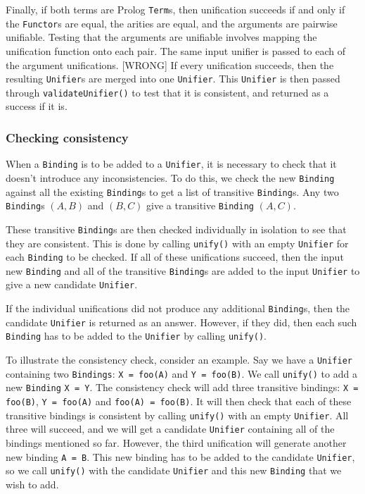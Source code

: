 \documentclass[12pt]{article}
\begin{document}
Finally, if both terms are Prolog \verb|Term|s, then unification succeeds if and only if the \verb|Functor|s are equal, the arities are equal, and the arguments are pairwise unifiable. 
Testing that the arguments are unifiable involves mapping the unification function onto each pair. 
The same input unifier is passed to each of the argument unifications. [WRONG]
If every unification succeeds, then the resulting \verb|Unifier|s are merged into one \verb|Unifier|. 
This \verb|Unifier| is then passed through \verb|validateUnifier()| to test that it is consistent, and returned as a success if it is.

\subsubsection{Checking consistency}


When a \verb|Binding| is to be added to a \verb|Unifier|, it is necessary to check that it doesn't introduce any inconsistencies. 
To do this, we check the new \verb|Binding| against all the existing \verb|Binding|s to get a list of transitive \verb|Binding|s. 
Any two \verb|Binding|s $(A,B)$ and $(B,C)$ give a transitive \verb|Binding| $(A,C)$.

These transitive \verb|Binding|s are then checked individually in isolation to see that they are consistent. 
This is done by calling \verb|unify()| with an empty \verb|Unifier| for each \verb|Binding| to be checked. 
If all of these unifications succeed, then the input new \verb|Binding| and all of the transitive \verb|Binding|s are added to the input \verb|Unifier| to give a new candidate \verb|Unifier|.

If the individual unifications did not produce any additional \verb|Binding|s, then the candidate \verb|Unifier| is returned as an answer. 
However, if they did, then each such \verb|Binding| has to be added to the \verb|Unifier| by calling \verb|unify()|.

To illustrate the consistency check, consider an example. 
Say we have a \verb|Unifier| containing two \verb|Bindings|: \verb|X = foo(A)| and \verb|Y = foo(B)|. 
We call \verb|unify()| to add a new \verb|Binding| \verb|X = Y|. 
The consistency check will add three transitive bindings: \verb|X = foo(B)|, \verb|Y = foo(A)| and \verb|foo(A) = foo(B)|. 
It will then check that each of these transitive bindings is consistent by calling \verb|unify()| with an empty \verb|Unifier|. 
All three will succeed, and we will get a candidate \verb|Unifier| containing all of the bindings mentioned so far.
However, the third unification will generate another new binding \verb|A = B|. 
This new binding has to be added to the candidate \verb|Unifier|, so we call \verb|unify()| with the candidate \verb|Unifier| and this new \verb|Binding| that we wish to add.
\end{document}
